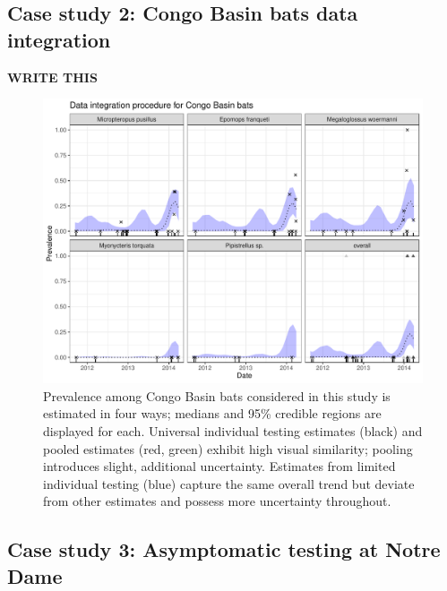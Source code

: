 \documentclass{article}
\begin{document}
\subsection{Case study 2: Congo Basin bats data integration}

{\bf WRITE THIS}

\begin{figure}[h!]
\centerline{\includegraphics[width=\textwidth]{Figure6.pdf}}
\caption{Prevalence among Congo Basin bats considered in this study is estimated in four ways; medians and 95\% credible regions are displayed for each. Universal individual testing estimates (black) and pooled estimates (red, green) exhibit high visual similarity; pooling introduces slight, additional uncertainty. Estimates from limited individual testing (blue) capture the same overall trend but deviate from other estimates and possess more uncertainty throughout. \label{fig2}}
\end{figure}

\subsection{Case study 3: Asymptomatic testing at Notre Dame}
\end{document}

